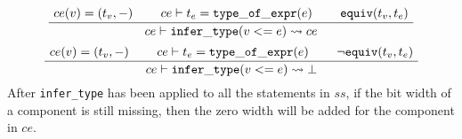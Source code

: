 \begin{gather}
    \inferiii[]
    {\seqq{ce \vdash {\tt infer\_type} (v<=e) \rightsquigarrow ce}}
    {\seqq{ce(v) = (t_v,-)}}
    {\seqq{ce \vdash t_e={\tt type\_of\_expr}(e)}} {\seqq{{\tt equiv}(t_v,t_e)}}
    \end{gather}
\begin{gather}
    \inferiii[]
    {\seqq{ce \vdash {\tt infer\_type} (v<=e) \rightsquigarrow \bot}}
    {\seqq{ce(v) = (t_v, -)}}
    {\seqq{ce \vdash t_e={\tt type\_of\_expr}(e)}} {\seqq{\neg{\tt equiv}(t_v,t_e)}}
    \end{gather}
After {\tt infer\_type} has been applied to all the statements in $ss$, if the bit width of a component is still missing, then the zero width will be added for the component in $ce$. 

